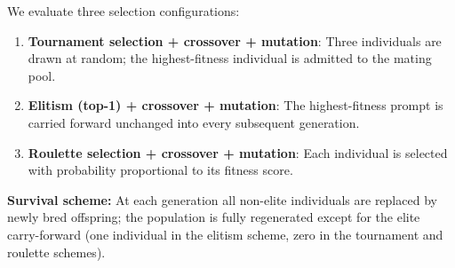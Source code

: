 


We evaluate three selection configurations:

\begin{enumerate}
    \item \textbf{Tournament selection + crossover + mutation}: Three individuals are drawn
    at random; the highest-fitness individual is admitted to the mating pool.

    \item \textbf{Elitism (top-1) + crossover + mutation}: The highest-fitness
    prompt is carried forward unchanged into every subsequent generation.

    \item \textbf{Roulette selection + crossover + mutation}: Each individual is selected
    with probability proportional to its fitness score.
\end{enumerate}

\textbf{Survival scheme:} At each generation all non-elite individuals are replaced by
newly bred offspring; the population is fully regenerated except for the elite
carry-forward (one individual in the elitism scheme, zero in the tournament and roulette
schemes).



